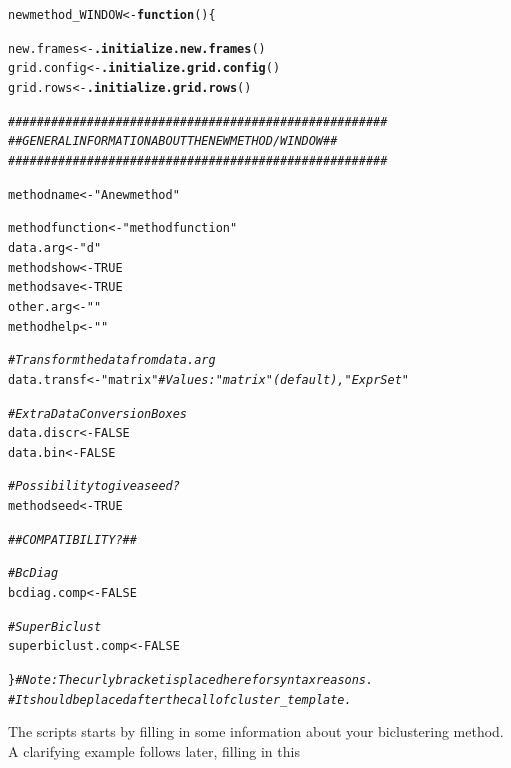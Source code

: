 \documentclass[a4paper]{article}\usepackage[]{graphicx}\usepackage[]{color}
\makeatletter
\newcommand{\hlnum}[1]{\textcolor[rgb]{0.686,0.059,0.569}{#1}}%
\newcommand{\hlstr}[1]{\textcolor[rgb]{0.192,0.494,0.8}{#1}}%
\newcommand{\hlcom}[1]{\textcolor[rgb]{0.678,0.584,0.686}{\textit{#1}}}%
\newcommand{\hlstd}[1]{\textcolor[rgb]{0.345,0.345,0.345}{#1}}%
\newcommand{\hlkwa}[1]{\textcolor[rgb]{0.161,0.373,0.58}{\textbf{#1}}}%
\newcommand{\hlkwb}[1]{\textcolor[rgb]{0.69,0.353,0.396}{#1}}%
\newcommand{\hlkwd}[1]{\textcolor[rgb]{0.737,0.353,0.396}{\textbf{#1}}}%
\newenvironment{kframe}{%
 \def\at@end@of@kframe{}%
 \ifinner\ifhmode%
  \def\at@end@of@kframe{\end{minipage}}%
  \begin{minipage}{\columnwidth}%
 \fi\fi%
 \def\FrameCommand##1{\hskip\@totalleftmargin \hskip-\fboxsep
 \colorbox{shadecolor}{##1}\hskip-\fboxsep
     \hskip-\linewidth \hskip-\@totalleftmargin \hskip\columnwidth}%
 \MakeFramed {\advance\hsize-\width
   \@totalleftmargin\z@ \linewidth\hsize
   \@setminipage}}%
 {\par\unskip\endMakeFramed%
 \at@end@of@kframe}
\newenvironment{knitrout}{}{} %
\makeatother
\begin{document}
\begin{knitrout}
\color{fgcolor}\begin{kframe}
\begin{alltt}
\hlstd{newmethod_WINDOW} \hlkwb{<-} \hlkwa{function}\hlstd{()\{}

        \hlstd{new.frames} \hlkwb{<-} \hlkwd{.initialize.new.frames}\hlstd{()}
        \hlstd{grid.config} \hlkwb{<-} \hlkwd{.initialize.grid.config}\hlstd{()}
        \hlstd{grid.rows} \hlkwb{<-} \hlkwd{.initialize.grid.rows}\hlstd{()}

        \hlcom{#####################################################}
        \hlcom{## GENERAL INFORMATION ABOUT THE NEW METHOD/WINDOW ##}
        \hlcom{#####################################################}

        \hlstd{methodname} \hlkwb{<-} \hlstr{"A new method"}

        \hlstd{methodfunction} \hlkwb{<-} \hlstr{"methodfunction"}
        \hlstd{data.arg} \hlkwb{<-} \hlstr{"d"}
        \hlstd{methodshow} \hlkwb{<-} \hlnum{TRUE}
        \hlstd{methodsave} \hlkwb{<-} \hlnum{TRUE}
        \hlstd{other.arg} \hlkwb{<-} \hlstr{""}
        \hlstd{methodhelp} \hlkwb{<-} \hlstr{""}

        \hlcom{# Transform the data from data.arg}
        \hlstd{data.transf} \hlkwb{<-} \hlstr{"matrix"} \hlcom{# Values: "matrix" (default), "ExprSet"}

        \hlcom{# Extra Data Conversion Boxes}
        \hlstd{data.discr} \hlkwb{<-} \hlnum{FALSE}
        \hlstd{data.bin} \hlkwb{<-} \hlnum{FALSE}

        \hlcom{# Possibility to give a seed ?}
        \hlstd{methodseed} \hlkwb{<-} \hlnum{TRUE}

        \hlcom{## COMPATIBILITY? ##}

        \hlcom{# BcDiag}
        \hlstd{bcdiag.comp} \hlkwb{<-} \hlnum{FALSE}

        \hlcom{# SuperBiclust}
        \hlstd{superbiclust.comp} \hlkwb{<-} \hlnum{FALSE}


\hlstd{\}} \hlcom{# Note: The curly bracket is placed here for syntax reasons. }
  \hlcom{#       It should be placed after the call of cluster_template.}
\end{alltt}
\end{kframe}
\end{knitrout}
\noindent The scripts starts by filling in some information about your
biclustering method. A clarifying example follows later, filling in this
\end{document}
